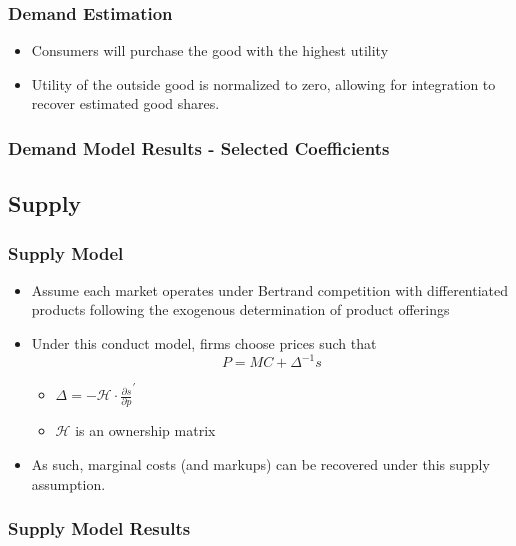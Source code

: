 \documentclass[xcolor=dvipsnames]{beamer}
\let\Oldsubsection\subsection
\renewcommand{\subsection}{\FloatBarrier\Oldsubsection}
\begin{document}
    \begin{frame}
        \frametitle{Demand Estimation}
        \begin{itemize}
            \item Consumers will purchase the good with the highest utility
            \item Utility of the outside good is normalized to zero, allowing for integration to recover estimated good shares.
        \end{itemize}
    \end{frame}

    \begin{frame}
        \frametitle{Demand Model Results - Selected Coefficients}
        \tiny
        \centering
        \begin{adjustbox}{max height=\dimexpr\textheight-5.5cm\relax,
           max width=\textwidth}

\end{adjustbox}
    \end{frame}
    
    \subsection{Supply}
    \begin{frame}
        \frametitle{Supply Model}
        \begin{itemize}
            \item Assume each market operates under Bertrand competition with differentiated products following the exogenous determination of product offerings
            \item Under this conduct model, firms choose prices such that  \vspace{-4mm} \[P = MC + \Delta^{-1} s\]
             \vspace{-8mm}
            \begin{itemize}
                \item  $\Delta = - \mathcal{H} \cdot \frac{\partial s}{\partial p}^{'}$
                \item $\mathcal{H}$ is an ownership matrix
            \end{itemize}
            \item As such, marginal costs (and markups) can be recovered under this supply assumption. 
        \end{itemize}
    \end{frame}

    \begin{frame}
        \frametitle{Supply Model Results}
        \tiny
        \centering
        \begin{adjustbox}{max height=\dimexpr\textheight-5.5cm\relax,
           max width=\textwidth}

\end{adjustbox}
    \end{frame}
\end{document}
